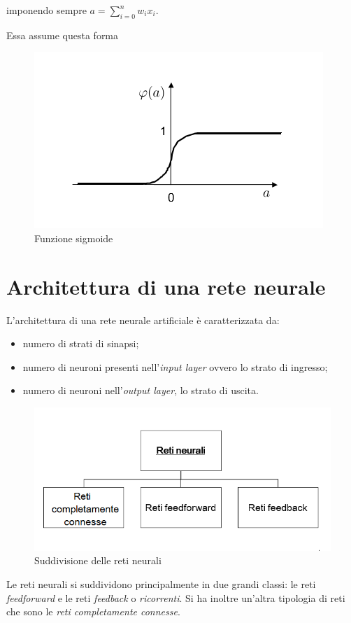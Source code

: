 \documentclass[12pt,a4paper,oneside]{book}
\begin{document}
		imponendo sempre $a=\sum\limits_{i=0}^n w_{i}x_{i}$.
	
		Essa assume questa forma
		\begin{figure}[h]
			\centering
			\includegraphics[width=0.6\linewidth]{IMMAGINI/sigmoide}
			\caption{ Funzione sigmoide }
			\label{fig:sigmoide}
		\end{figure}
	
		\clearpage
		\section{Architettura di una rete neurale }
		
		L'architettura di una rete neurale artificiale è caratterizzata da:
		
		\begin{itemize}
			\item numero di strati di sinapsi;
			\item numero di neuroni presenti nell'\emph{input layer} ovvero lo strato di ingresso;
			\item numero di neuroni nell'\emph{output layer}, lo strato di uscita.
		\end{itemize}
	
		\begin{figure}[h]
			\centering
			\includegraphics[width=0.7\linewidth]{IMMAGINI/diagrammareti}
			\caption{ Suddivisione delle reti neurali}
			\label{fig:diagrammareti}
		\end{figure}
		
		
		Le reti neurali si suddividono principalmente in due grandi classi: le reti \emph{feedforward} e le reti \emph{feedback} o \emph{ricorrenti}. 
		Si ha inoltre un'altra tipologia di reti che sono le \emph{reti completamente connesse}.\\
		
\end{document}
